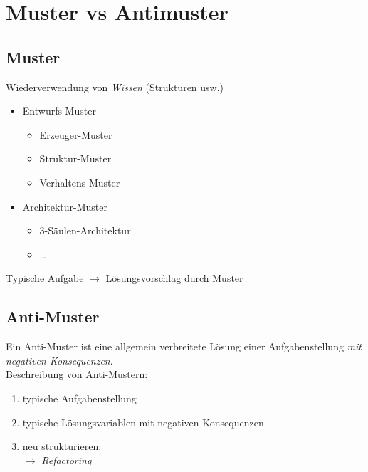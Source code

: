 \section{Muster vs Antimuster}
\subsection{Muster}
Wiederverwendung von \emph{Wissen} (Strukturen usw.)
\begin{itemize}
\item Entwurfs-Muster
\begin{itemize}
\item Erzeuger-Muster
\item Struktur-Muster
\item Verhaltens-Muster
\end{itemize}
\item Architektur-Muster
\begin{itemize}
\item 3-Säulen-Architektur
\item …
\end{itemize}
\end{itemize}
Typische Aufgabe $\to$ Lösungsvorschlag durch Muster
\subsection{Anti-Muster}
Ein Anti-Muster ist eine allgemein verbreitete Lösung einer Aufgabenstellung \emph{mit negativen Konsequenzen}.\\
Beschreibung von Anti-Mustern:
\begin{enumerate}
\item typische Aufgabenstellung
\item typische Lösungsvariablen mit negativen Konsequenzen
\item neu strukturieren:\\
$\to$ \emph{Refactoring}
\end{enumerate}
